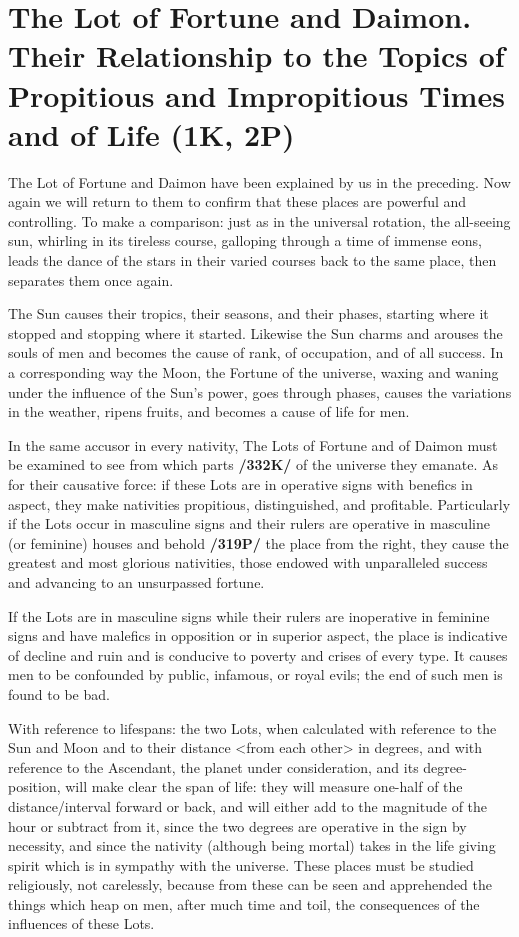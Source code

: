\section{The Lot of Fortune and Daimon. Their Relationship to the Topics of Propitious and Impropitious Times and of Life (1K, 2P)}

The Lot of Fortune and Daimon have been explained by us in the preceding. Now again we will return to them to confirm that these places are powerful and controlling. To make a comparison: just as in
the universal rotation, the all-seeing sun, whirling in its tireless course, galloping through a time of immense eons, leads the dance of the stars in their varied courses back to the same place, then separates them once again. 

The Sun causes their tropics, their seasons, and their phases, starting where it stopped and stopping where it started. Likewise the Sun charms and arouses the souls of men and becomes the cause of rank, of occupation, and of all success. In a corresponding way the Moon, the Fortune of the universe, waxing and waning under the influence of the Sun’s power, goes through phases, causes the variations in the weather, ripens fruits, and becomes a cause of life for men. 

In the same accusor in every nativity, The Lots of Fortune and of Daimon must be examined to see from which parts \textbf{/332K/} of the universe they emanate. As for their causative force: if these Lots are in operative signs with benefics in aspect, they make nativities propitious, distinguished, and profitable. Particularly if the Lots occur in
masculine signs and their rulers are operative in masculine (or feminine) houses and behold \textbf{/319P/} the place from the right, they cause the greatest and most glorious nativities, those endowed with unparalleled success and advancing to an unsurpassed fortune. 

If the Lots are in masculine signs while their rulers are inoperative in feminine signs and have malefics in opposition or in superior aspect, the place is indicative of decline and ruin and is conducive to poverty and crises of every type. It causes men to be confounded by public, infamous, or royal evils; the end of such men is found to be bad.

With reference to lifespans: the two Lots, when calculated with reference to the Sun and Moon and to their distance <from each other> in degrees, and with reference to the Ascendant, the planet under consideration, and its degree-position, will make clear the span of life: they will measure one-half of the distance/interval forward or back, and will either add to the magnitude of the hour or subtract from it, since the two degrees are operative in the sign by necessity, and since the nativity (although being mortal) takes in the life giving spirit which is in sympathy with the universe. These places must be studied religiously, not carelessly, because from these can be seen and  apprehended the things which heap on men, after much time and toil, the consequences of the influences of these Lots. 

